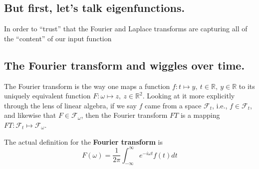 \documentclass[letterpaper,12pt]{report}
\begin{document}






\subsection{But first, let's talk eigenfunctions.}

In order to ``trust'' that the Fourier and Laplace transforms are capturing all of the
``content'' of our input function


\subsection{The Fourier transform and wiggles over time.}

The Fourier transform is the way one maps a function
\(f: t \mapsto y,\ t \in \mathbb{R}, \ y \in \mathbb{R}\)
to its uniquely equivalent function \(F: \omega \mapsto z, \ z \in \mathbb{R}^2\).
Looking at it more explicitly through the lens of linear algebra,
if we say \(f\) came from a space \(\mathcal{F}_t\), i.e., \(f \in \mathcal{F}_t\), and
likewise that \(F \in \mathcal{F}_\omega\), then the Fourier transform \(FT\) is a mapping
\(FT: \mathcal{F}_t \mapsto \mathcal{F}_\omega\).\par

The actual definition for the \textbf{Fourier transform} is
\begin{equation}
  F(\omega) = \frac{1}{2\pi} \int_{-\infty}^{\infty}e^{-i\omega t}f(t)dt
\end{equation}\label{equation:fourier-transform}
\end{document}
